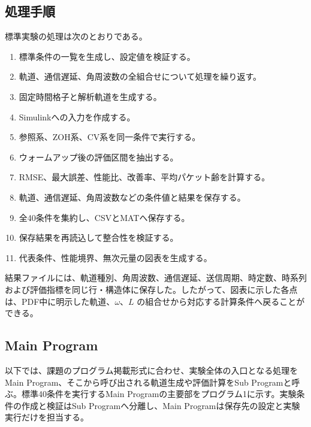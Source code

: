 \documentclass[11pt,a4paper]{article}
\begin{document}
\subsection{処理手順}

標準実験の処理は次のとおりである。
\begin{enumerate}[leftmargin=2.4em,itemsep=0.18em]
\item 標準条件の一覧を生成し、設定値を検証する。
\item 軌道、通信遅延、角周波数の全組合せについて処理を繰り返す。
\item 固定時間格子と解析軌道を生成する。
\item Simulinkへの入力を作成する。
\item 参照系、ZOH系、CV系を同一条件で実行する。
\item ウォームアップ後の評価区間を抽出する。
\item RMSE、最大誤差、性能比、改善率、平均パケット齢を計算する。
\item 軌道、通信遅延、角周波数などの条件値と結果を保存する。
\item 全40条件を集約し、CSVとMATへ保存する。
\item 保存結果を再読込して整合性を検証する。
\item 代表条件、性能境界、無次元量の図表を生成する。
\end{enumerate}

結果ファイルには、軌道種別、角周波数、通信遅延、送信周期、時定数、時系列および評価指標を同じ行・構造体に保存した。したがって、図表に示した各点は、PDF中に明示した軌道、$\omega$、$L$ の組合せから対応する計算条件へ戻ることができる。

\subsection{Main Program}

以下では、課題のプログラム掲載形式に合わせ、実験全体の入口となる処理をMain Program、そこから呼び出される軌道生成や評価計算をSub Programと呼ぶ。標準40条件を実行するMain Programの主要部をプログラム1に示す。実験条件の作成と検証はSub Programへ分離し、Main Programは保存先の設定と実験実行だけを担当する。
\end{document}

